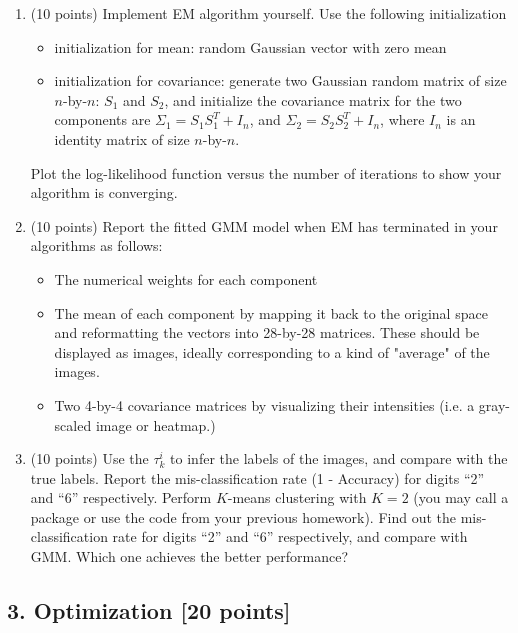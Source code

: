\documentclass[12pt]{article}
\begin{document}
\begin{enumerate}[label*=\arabic*.]


\item (10 points) Implement EM algorithm yourself. Use the following initialization
\begin{itemize}
\item initialization for mean: random Gaussian vector with zero mean
\item initialization for covariance: generate two Gaussian random matrix of size $n$-by-$n$: $S_1$ and $S_2$, and initialize the covariance matrix for the two components are $\Sigma_1 = S_1 S_1^T + I_n$, and  $\Sigma_2 = S_2 S_2^T + I_n$, where $I_n$ is an identity matrix of size $n$-by-$n$. 
\end{itemize}
Plot the log-likelihood function versus the number of iterations to show your algorithm is converging.

\item (10 points) Report the fitted GMM model when EM has terminated in your algorithms as follows:
\begin{itemize}
    \item The numerical weights for each component
    \item The mean of each component by mapping it back to the original space and reformatting the vectors into 28-by-28 matrices. These should be displayed as images, ideally corresponding to a kind of "average" of the images.
    \item Two 4-by-4 covariance matrices by visualizing their intensities (i.e. a gray-scaled image or heatmap.)
\end{itemize}

\item (10 points) Use the $\tau_{k}^i$ to infer the labels of the images, and compare with the true labels. Report the mis-classification rate (1 - Accuracy) for digits ``2'' and ``6'' respectively. Perform $K$-means clustering with $K=2$ (you may call a package or use the code from your previous homework). Find out the  mis-classification rate for digits ``2'' and ``6'' respectively, and compare with GMM. Which one achieves the better performance?

\end{enumerate}

\pagebreak
\subsection*{3. Optimization [20 points]}
\end{document}
